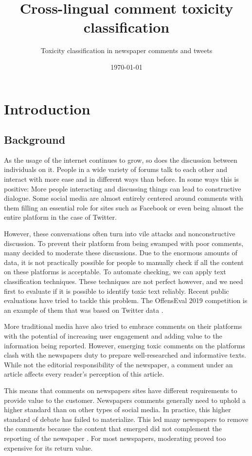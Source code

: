 \documentclass[nofilelist]{cslthse-msc}
\title{Cross-lingual comment toxicity classification}
\subtitle{Toxicity classification in newspaper comments and tweets}
\date{\today}
\begin{document}
\renewcommand{\bibname}{References}

\makefrontmatter
\chapter[Introduction]{Introduction}
\section{Background}
As the usage of the internet continues to grow, so does the discussion between individuals on it. People in a wide variety of forums talk to each other and interact with more ease and in different ways than before. In some ways this is positive: More people interacting and discussing things can lead to constructive dialogue. Some social media are almost entirely centered around comments with them filling an essential role for sites such as Facebook or even being almost the entire platform in the case of Twitter. 

However, these conversations often turn into vile attacks and nonconstructive discussion. To prevent their platform from being swamped with poor comments, many decided to moderate these discussions. Due to the enormous amounts of data, it is not practically possible for people to manually check if all the content on these platforms is acceptable. To automate checking, we can apply text classification techniques. These techniques are not perfect however, and we need first to evaluate if it is possible to identify toxic text reliably. Recent public evaluations have tried to tackle this problem. The OffensEval 2019 competition is an example of them that was based on Twitter data \citep{zampieri2019semeval}.

More traditional media have also tried to embrace comments on their platforms with the potential of increasing user engagement and adding value to the information being reported. However, emerging toxic comments on the platforms clash with the newspapers duty to prepare well-researched and informative texts. While not the editorial responsibility of the newspaper, a comment under an article  affects every reader's perception of this article. 

This means that comments on newspapers sites have different requirements to provide value to the customer. Newspapers comments  generally need to uphold a higher standard than on other types of social media. In practice, this higher standard of debate has failed to materialize. This led many newspapers to remove the comments because the content that emerged did not complement the reporting of the newspaper \citep{trygg2012comment}. For most newspapers, moderating proved too expensive for its return value.
\end{document}
